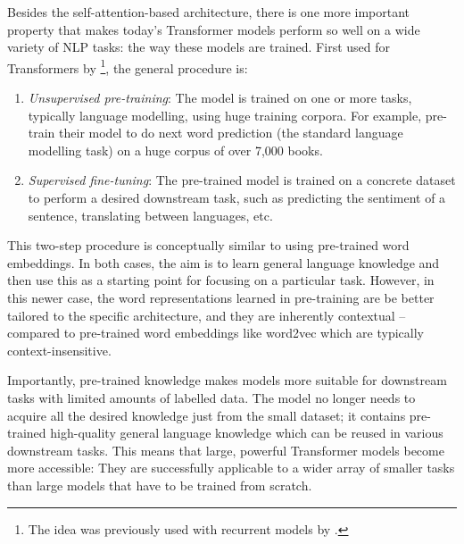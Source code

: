 \documentclass[bsc,frontabs,singlespacing,parskip,deptreport]{infthesis}
\begin{document}
{{{      %
      Besides the self-attention-based architecture, there is one more important property that makes today's Transformer models perform so well on a wide variety of NLP tasks: the way these models are trained. First used for Transformers by \citet{Radford_2018}\footnote{The idea was previously used with recurrent models by \citet{Dai_2015}.}, the general procedure is:
      \begin{enumerate}
        \item \textit{Unsupervised pre-training}: The model is trained on one or more tasks, typically language modelling, using huge training corpora. For example, \citeauthor{Radford_2018} pre-train their model to do next word prediction (the standard language modelling task) on a huge corpus of over 7,000 books.
        \item \textit{Supervised fine-tuning}: The pre-trained model is trained on a concrete dataset to perform a desired downstream task, such as predicting the sentiment of a sentence, translating between languages, etc.
      \end{enumerate}
      This two-step procedure is conceptually similar to using pre-trained word embeddings. In both cases, the aim is to learn general language knowledge and then use this as a starting point for focusing on a particular task. However, in this newer case, the word representations learned in pre-training are be better tailored to the specific architecture, and they are inherently contextual -- compared to pre-trained word embeddings like word2vec which are typically context-insensitive. 

      Importantly, pre-trained knowledge makes models more suitable for downstream tasks with limited amounts of labelled data. The model no longer needs to acquire all the desired knowledge just from the small dataset; it contains pre-trained high-quality general language knowledge which can be reused in various downstream tasks. This means that large, powerful Transformer models become more accessible: They are successfully applicable to a wider array of smaller tasks than large models that have to be trained from scratch.
    }

}}
\end{document}
